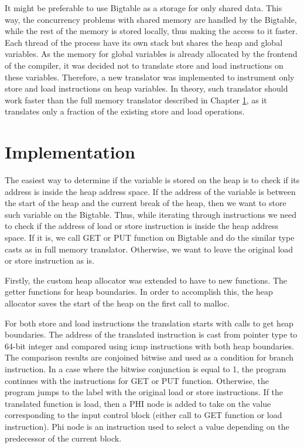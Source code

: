 \documentclass[bsc,frontabs,twoside,singlespacing,parskip,deptreport]{infthesis}     %
\begin{document}
It might be preferable to use Bigtable as a storage for only shared data. This way, the concurrency problems with shared memory are handled by the Bigtable, while the rest of the memory is stored locally, thus making the access to it faster. Each thread of the process have its own stack but shares the heap and global variables. As the memory for global variables is already allocated by the frontend of the compiler, it was decided not to translate store and load instructions on these variables. Therefore, a new translator was implemented to instrument only store and load instructions on heap variables. In theory, such translator should work faster than the full memory translator described in Chapter \ref{}, as it translates only a fraction of the existing store and load operations. 

\section{Implementation}

The easiest way to determine if the variable is stored on the heap is to check if its address is inside the heap address space. If the address of the variable is between the start of the heap and the current break of the heap, then we want to store such variable on the Bigtable. Thus, while iterating through instructions we need to check if the address of load or store instruction is inside the heap address space. If it is, we call GET or PUT function on Bigtable and do the similar type casts as in full memory translator. Otherwise, we want to leave the original load or store instruction as is. 

Firstly, the custom heap allocator was extended to have to new functions. The getter functions for heap boundaries. In order to accomplish this, the heap allocator saves the start of the heap on the first call to malloc.

For both store and load instructions the translation starts with calls to get heap boundaries. The address of the translated instruction is cast from pointer type to 64-bit integer and compared using icmp instructions with both heap boundaries. The comparison results are conjoined bitwise and used as a condition for branch instruction. In a case where the bitwise conjunction is equal to 1, the program continues with the instructions for GET or PUT function. Otherwise, the program jumps to the label with the original load or store instructions. If the translated function is load, then a PHI node is added to take on the value corresponding to the input control block (either call to GET function or load instruction). Phi node is an instruction used to select a value depending on the predecessor of the current block.
\end{document}
